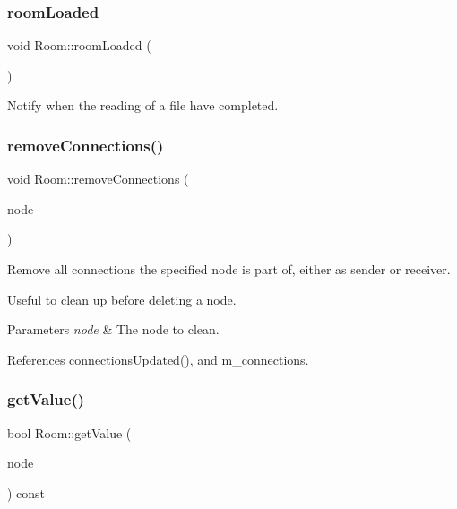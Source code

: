 \subsubsection{\texorpdfstring{room\+Loaded}{roomLoaded}}
{\footnotesize\ttfamily void Room\+::room\+Loaded (\begin{DoxyParamCaption}{ }\end{DoxyParamCaption})\hspace{0.3cm}{\ttfamily [signal]}}

Notify when the reading of a file have completed. \mbox{\label{classRoom_ae87a5e306907216bd57a90ea2a2a5a46}} 
\subsubsection{\texorpdfstring{remove\+Connections()}{removeConnections()}\hspace{0.1cm}{\footnotesize\ttfamily [2/2]}}
{\footnotesize\ttfamily void Room\+::remove\+Connections (\begin{DoxyParamCaption}\item[{\mbox{\hyperlink{classNode}{Node}} $\ast$}]{node }\end{DoxyParamCaption})\hspace{0.3cm}{\ttfamily [private]}}



Remove all connections the specified node is part of, either as sender or receiver. 

Useful to clean up before deleting a node. 
\begin{DoxyParams}{Parameters}
{\em node} & The node to clean. \\
\hline
\end{DoxyParams}


References connections\+Updated(), and m\+\_\+connections.

\mbox{\label{classRoom_a5b197766e033600e4358c65781e11e73}} 
\subsubsection{\texorpdfstring{get\+Value()}{getValue()}}
{\footnotesize\ttfamily bool Room\+::get\+Value (\begin{DoxyParamCaption}\item[{const \mbox{\hyperlink{classNode}{Node}} $\ast$}]{node }\end{DoxyParamCaption}) const\hspace{0.3cm}{\ttfamily [private]}}



